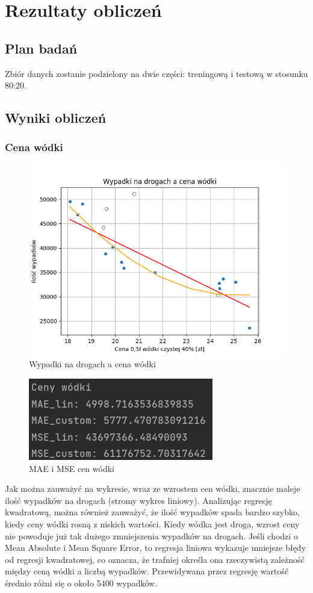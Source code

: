 \documentclass[10pt]{article}
\begin{document}
\section{Rezultaty obliczeń}

\subsection{Plan badań}
Zbiór danych zostanie podzielony na dwie części: treningową i testową w stosunku 80:20. 
\pagebreak

\subsection{Wyniki obliczeń}

\subsubsection{Cena wódki}
\begin{figure}[h]
\begin{center}
\includegraphics[width=0.5\linewidth]{images/plots/wodka.png}
\caption{Wypadki na drogach a cena wódki}
\end{center}
\end{figure}
\begin{figure}[h]
\begin{center}
\includegraphics[width=0.5\linewidth]{images/errors/wodka_errors.png}
\caption{MAE i MSE cen wódki}
\end{center}
\end{figure}

Jak można zauważyć na wykresie, wraz ze wzrostem cen wódki, znacznie maleje ilość wypadków na drogach (stromy wykres liniowy). Analizując regresję kwadratową, można również zauważyć, że ilość wypadków spada bardzo szybko, kiedy ceny wódki rosną z niskich wartości. Kiedy wódka jest droga, wzrost ceny nie powoduje już tak dużego zmniejszenia wypadków na drogach. Jeśli chodzi o Mean Absolute i Mean Square Error, to regresja liniowa wykazuje mniejsze błędy od regresji kwadratowej, co oznacza, że trafniej określa ona rzeczywistą zależność między ceną wódki a liczbą wypadków. Przewidywana przez regresję wartość średnio różni się o około 5400 wypadków.
\pagebreak
\end{document}
